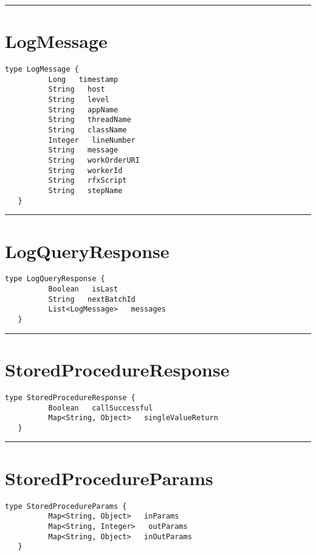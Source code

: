 \rule{12cm}{2pt}
\section{LogMessage}
\label{type:LogMessage}

\begin{lstlisting}[style=nonumbers]
   type LogMessage {
          Long   timestamp
          String   host
          String   level
          String   appName
          String   threadName
          String   className
          Integer   lineNumber
          String   message
          String   workOrderURI
          String   workerId
          String   rfxScript
          String   stepName
   }
\end{lstlisting}

\rule{12cm}{2pt}
\section{LogQueryResponse}
\label{type:LogQueryResponse}

\begin{lstlisting}[style=nonumbers]
   type LogQueryResponse {
          Boolean   isLast
          String   nextBatchId
          List<LogMessage>   messages
   }
\end{lstlisting}

\rule{12cm}{2pt}
\section{StoredProcedureResponse}
\label{type:StoredProcedureResponse}

\begin{lstlisting}[style=nonumbers]
   type StoredProcedureResponse {
          Boolean   callSuccessful
          Map<String, Object>   singleValueReturn
   }
\end{lstlisting}

\rule{12cm}{2pt}
\section{StoredProcedureParams}
\label{type:StoredProcedureParams}

\begin{lstlisting}[style=nonumbers]
   type StoredProcedureParams {
          Map<String, Object>   inParams
          Map<String, Integer>   outParams
          Map<String, Object>   inOutParams
   }
\end{lstlisting}


